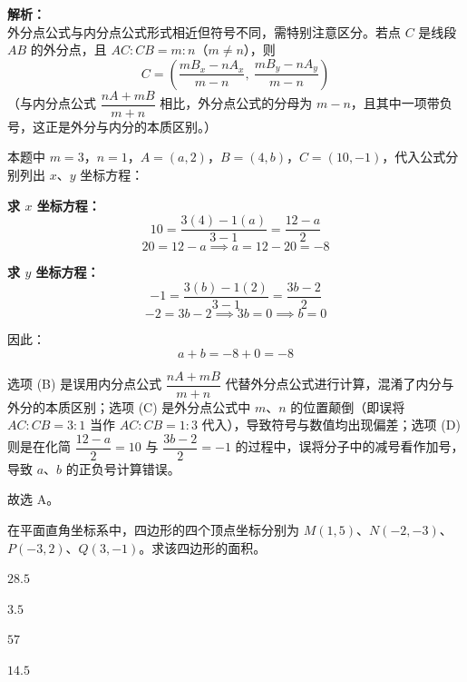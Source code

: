 \documentclass[12pt,a4paper]{exam-zh}
\begin{document}
\begin{solution}
    \textbf{解析：} \\
    外分点公式与内分点公式形式相近但符号不同，需特别注意区分。若点 $C$ 是线段 $AB$ 的外分点，且 $AC : CB = m : n$（$m \neq n$），则
    \[ \displaystyle C = \left( \frac{mB_x - nA_x}{m - n},\ \frac{mB_y - nA_y}{m - n} \right) \]
    （与内分点公式 $\dfrac{nA+mB}{m+n}$ 相比，外分点公式的分母为 $m-n$，且其中一项带负号，这正是外分与内分的本质区别。）

    本题中 $m=3$，$n=1$，$A=(a,2)$，$B=(4,b)$，$C=(10,-1)$，代入公式分别列出 $x$、$y$ 坐标方程：

    \textbf{求 $x$ 坐标方程：}
    \[ \displaystyle 10 = \frac{3(4) - 1(a)}{3 - 1} = \frac{12 - a}{2} \]
    \[ \displaystyle 20 = 12 - a \implies a = 12 - 20 = -8 \]

    \textbf{求 $y$ 坐标方程：}
    \[ \displaystyle -1 = \frac{3(b) - 1(2)}{3 - 1} = \frac{3b - 2}{2} \]
    \[ \displaystyle -2 = 3b - 2 \implies 3b = 0 \implies b = 0 \]

    因此：
    \[ \displaystyle a + b = -8 + 0 = -8 \]

    选项 (B) 是误用内分点公式 $\dfrac{nA+mB}{m+n}$ 代替外分点公式进行计算，混淆了内分与外分的本质区别；选项 (C) 是外分点公式中 $m$、$n$ 的位置颠倒（即误将 $AC:CB=3:1$ 当作 $AC:CB=1:3$ 代入），导致符号与数值均出现偏差；选项 (D) 则是在化简 $\dfrac{12-a}{2}=10$ 与 $\dfrac{3b-2}{2}=-1$ 的过程中，误将分子中的减号看作加号，导致 $a$、$b$ 的正负号计算错误。

    故选 A。
\end{solution}


\begin{question}
    在平面直角坐标系中，四边形的四个顶点坐标分别为 $M(1, 5)$、$N(-2, -3)$、$P(-3, 2)$、$Q(3, -1)$。求该四边形的面积。\paren[A]
    \begin{choices}
        \item $28.5$
        \item $3.5$
        \item $57$
        \item $14.5$
    \end{choices}
\end{question}
\end{document}
